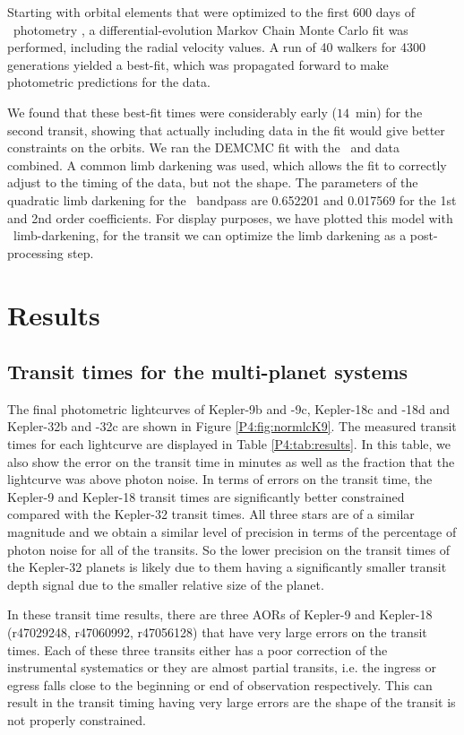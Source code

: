 Starting with orbital elements that were optimized to the first 600 days of \Kepler~photometry \citep{Doyle2011}, a differential-evolution Markov Chain Monte Carlo \citep[DEMCMC;][]{TerBraak2005} fit was performed, including the radial velocity values. A run of 40 walkers for 4300 generations yielded a best-fit, which was propagated forward to make photometric predictions for the \spitzer data.

We found that these best-fit times were considerably early ($14$~min) for the second transit, showing that actually including \spitzer data in the fit would give better constraints on the orbits. We ran the DEMCMC fit with the \Kepler~and \spitzer data combined. A common limb darkening was used, which allows the fit to correctly adjust to the timing of the \spitzer data, but not the shape. The parameters of the quadratic limb darkening for the \Kepler~bandpass are 0.652201 and 0.017569 for the 1st and 2nd order coefficients. For display purposes, we have plotted this model with \Kepler~limb-darkening, for the \spitzer transit we can optimize the limb darkening as a post-processing step.

\section{Results}
\label{P4:sec:results}

\subsection{Transit times for the multi-planet systems}

The final photometric lightcurves of Kepler-9b and -9c, Kepler-18c and -18d and Kepler-32b and -32c are shown in Figure \ref{P4:fig:normlcK9}. The measured transit times for each lightcurve are displayed in Table \ref{P4:tab:results}. In this table, we also show the error on the transit time in minutes as well as the fraction that the lightcurve was above photon noise. In terms of errors on the transit time, the Kepler-9 and Kepler-18 transit times are significantly better constrained compared with the Kepler-32 transit times. All three stars are of a similar magnitude and we obtain a similar level of precision in terms of the percentage of photon noise for all of the transits. So the lower precision on the transit times of the Kepler-32 planets is likely due to them having a significantly smaller transit depth signal due to the smaller relative size of the planet.

In these transit time results, there are three AORs of Kepler-9 and Kepler-18 (r47029248, r47060992, r47056128) that have very large errors on the transit times. Each of these three transits either has a poor correction of the instrumental systematics or they are almost partial transits, i.e. the ingress or egress falls close to the beginning or end of observation respectively. This can result in the transit timing having very large errors are the shape of the transit is not properly constrained.

